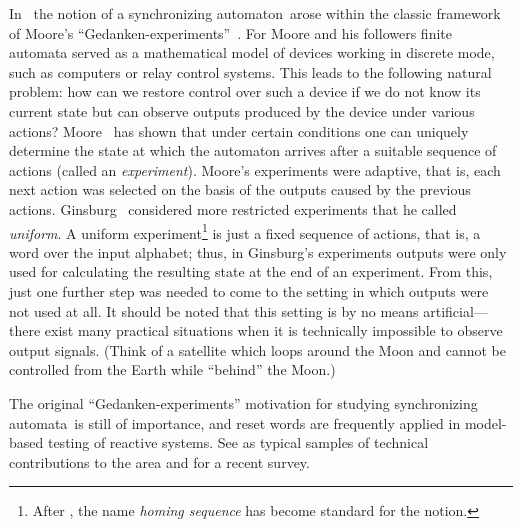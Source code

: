 \documentclass{irmaart}
\newcommand{\sa}{synchronizing au\-tom\-a\-ta}
\newcommand{\san}{synchronizing au\-tom\-a\-ton}
\theoremstyle{plain}
\begin{document}
In~\cite{Cerny:1964} the notion of a \san\ arose within the classic framework
of Moore's ``Gedanken-experiments''~\cite{Moore:1956}. For Moore and his
followers finite automata served as a mathematical model of devices working in
discrete mode, such as computers or relay control systems. This leads to the
following natural problem: how can we restore control over such a device if we
do not know its current state but can observe outputs produced by the device
under various actions? Moore~\cite{Moore:1956} has shown that under certain
conditions one can uniquely determine the state at which the automaton arrives
after a suitable sequence of actions (called an \emph{experiment}). Moore's
experiments were adaptive, that is, each next action was selected on the basis
of the outputs caused by the previous actions. Ginsburg~\cite{Ginsburg:1958}
considered more restricted experiments that he called \emph{uniform}. A uniform
experiment\footnote{After \cite{Gill:1961}, the name \emph{homing sequence} has
become standard for the notion.} is just a fixed sequence of actions, that is,
a word over the input alphabet; thus, in Ginsburg's experiments outputs were
only used for calculating the resulting state at the end of an experiment. From
this, just one further step was needed to come to the setting in which outputs
were not used at all. It should be noted that this setting is by no means
artificial---there exist many practical situations when it is technically
impossible to observe output signals. (Think of a satellite which loops around
the Moon and cannot be controlled from the Earth while ``behind'' the Moon.)

The original ``Gedanken-experiments'' motivation for studying \sa\
is still of importance, and reset words are frequently applied in
model-based testing of reactive systems. See \cite{Cho&Jeong&Somenzi&Pixley:1993,
Boppana&Rajan&Takayama&Fujita:1999} as typical samples of technical
contributions to the area and \cite{Sandberg:2005} for a recent survey.
\end{document}
